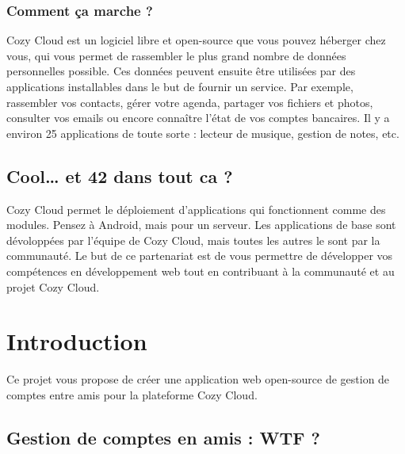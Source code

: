\documentclass{42-fr}
\begin{document}
		\subsection{Comment ça marche ?}

			Cozy Cloud est un logiciel libre et open-source que vous pouvez h\'eberger chez vous,
			qui vous permet de rassembler le plus grand nombre de donn\'ees
			personnelles possible. Ces donn\'ees peuvent ensuite \^etre utilis\'ees par des
			applications installables dans le but de fournir un service. Par exemple,
			rassembler vos contacts, g\'erer votre agenda, partager vos fichiers et
			photos, consulter vos emails ou encore conna\^itre l'\'etat de vos comptes
			bancaires. Il y a environ 25 applications de toute sorte : lecteur de musique,
			gestion de notes, etc.

	\section{Cool… et 42 dans tout ca ?}

		Cozy Cloud permet le d\'eploiement d'applications qui fonctionnent comme
		des modules. Pensez \`a Android, mais pour un serveur. Les applications de
		base sont d\'evolopp\'ees par l'\'equipe de Cozy Cloud, mais toutes
		les autres le sont par la communaut\'e. Le but de ce partenariat est de vous
		permettre de d\'evelopper vos comp\'etences en d\'eveloppement web tout
		en contribuant \`a la communaut\'e et au projet Cozy Cloud.


\chapter{Introduction}

	Ce projet vous propose de cr\'eer une application web open-source de gestion de
	comptes entre amis pour la plateforme Cozy Cloud.

	\section{Gestion de comptes en amis : WTF ?}
\end{document}

